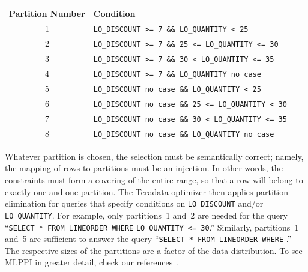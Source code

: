 \documentclass[runningheads]{comsis2}
\begin{document}
\begin{center}
{\footnotesize
\begin{tabular}{|c|l|}\hline 
Partition Number & Condition \\ \hline
1		& {{\tt LO\_DISCOUNT >= 7 \&\& LO\_QUANTITY < 25}} \\ \hline
2		& {{\tt LO\_DISCOUNT >= 7 \&\& 25 <= LO\_QUANTITY <= 30}} \\ \hline
3		& {{\tt LO\_DISCOUNT >= 7 \&\& 30 < LO\_QUANTITY <= 35}} \\ \hline
4		& {{\tt LO\_DISCOUNT >= 7 \&\& LO\_QUANTITY no case}}\\ \hline
5       & {{\tt LO\_DISCOUNT no case \&\& LO\_QUANTITY < 25}} \\ \hline 
6		& {{\tt LO\_DISCOUNT no case \&\& 25 <= LO\_QUANTITY < 30}} \\\hline								  	        
7		& {{\tt LO\_DISCOUNT no case \&\& 30 < LO\_QUANTITY <= 35}} \\ \hline
8		& {{\tt LO\_DISCOUNT no case \&\& LO\_QUANTITY no case}} \\ \hline
\end{tabular}
}
\end{center}

Whatever partition is chosen, 
the selection must be semantically correct; namely, 
the mapping of rows to partitions must be an injection. 
In other words, the constraints must form a covering of 
the entire range, so that a row will belong to exactly one and one partition. 
The Teradata optimizer then applies \hbox{partition} elimination for queries 
that specify conditions on {\tt LO\_DISCOUNT} and/or {\tt LO\_QUANTITY}. 
For \hbox{example}, only partitions~1 and~2 are needed for the query 
``{\tt SELECT * FROM LINEORDER WHERE}  {\tt LO\_QUANTITY <= 30}.'' 
Similarly, partitions~1 and~5 are sufficient to answer the query 
``{\tt SELECT * FROM LINEORDER WHERE} .'' 
The respective sizes of the partitions are a factor of the data distribution. 
To see MLPPI in greater detail, check our references~\cite{klindt09mlppi,sinclair:ppi}. 


\end{document}
